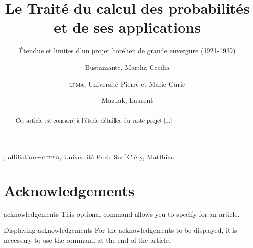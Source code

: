 \documentclass[english,nolocaltoc]{nwejmart}
\newtheorem[style=definition]{fact}
\newtheorem[title=experience]{experience}
\newtheorem[title-plural=rings]{ring}
\newtheorem[title=ideal,title-plural=ideals]{ideal}
\begin{document}
\begin{bodycode}[listing options={deletekeywords={[2]title,article},deletekeywords={[5]keywords}}]
\title[Le Traité du calcul des probabilités]{Le Traité du calcul des
  probabilités et de ses applications}
\subtitle[Étendue et limites d'un projet borélien]{Étendue et
  limites d'un projet borélien de grande envergure (1921-1939)}
%
\author[
  affiliation={Laboratoire \textsc{sphere}, Université Paris Diderot}
  ]{Bustamante, Martha-Cecilia}
\author[
  affiliation=[aff2]{\textsc{lpma}, Université Pierre et Marie Curie},
  affiliation={\textsc{ghdso}, Université Paris-Sud}]{Cléry, Matthias}
\author[
  affiliationtagged={aff2}
]{Mazliak, Laurent}
%
\begin{abstract}
  Cet article est consacré à l'étude détaillée du vaste projet [...]
\end{abstract}
%
%
\maketitle
\end{bodycode}

\section{Acknowledgements}
\label{sec:remerciements}

\begin{docCommand}{acknowledgements}{}
  This optional command allows you to specify  for an article.
\end{docCommand}

\begin{bodycode}[listing options={deletekeywords={[2]first}}]
\end{bodycode}

\begin{dbremark}{Displaying acknowledgements}{}
  For the acknowledgements to be displayed, it is necessary to use the
   command at the end of the article.
\end{dbremark}
\end{document}
